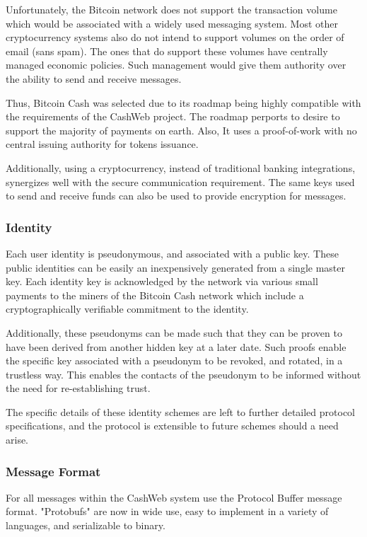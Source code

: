 \documentclass{article}
\begin{document}
Unfortunately, the Bitcoin network does not support the transaction volume which would be associated with a widely used messaging system. Most other cryptocurrency systems also do not intend to support volumes on the order of email (sans spam). The ones that do support these volumes have centrally managed economic policies. Such management would give them authority over the ability to send and receive messages.

Thus, Bitcoin Cash was selected due to its roadmap being highly compatible with the requirements of the CashWeb project. The roadmap perports to desire to support the majority of payments on earth. Also, It uses a proof-of-work with no central issuing authority for tokens issuance.

Additionally, using a cryptocurrency, instead of traditional banking integrations, synergizes well with the secure communication requirement. The same keys used to send and receive funds can also be used to provide encryption for messages.

\subsubsection{Identity}

Each user identity is pseudonymous, and associated with a public key. These public identities can be easily an inexpensively generated from a single master key. Each identity key is acknowledged by the network via various small payments to the miners of the Bitcoin Cash network which include a cryptographically verifiable commitment to the identity.

Additionally, these pseudonyms can be made such that they can be proven to have been derived from another hidden key at a later date. Such proofs enable the specific key associated with a pseudonym to be revoked, and rotated, in a trustless way. This enables the contacts of the pseudonym to be informed without the need for re-establishing trust.

The specific details of these identity schemes are left to further detailed protocol specifications, and the protocol is extensible to future schemes should a need arise.

\subsubsection{Message Format}

For all messages within the CashWeb system use the Protocol Buffer message format. "Protobufs" are now in wide use, easy to implement in a variety of languages, and serializable to binary.
\end{document}
